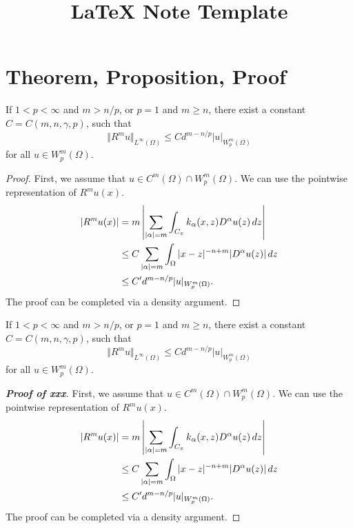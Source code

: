 \documentclass{article}
\title{\LaTeX{} Note Template}
\author{}
\date{}
\begin{document}
\maketitle

\section{Theorem, Proposition, Proof}

\begin{theorem}
    If $1<p<\infty$ and $m > n/p$, or $p=1$ and $m \ge n$, there exist a constant $C = C(m,n,\gamma,p)$, such that
    \begin{equation*}
        \Vert R^m u \Vert_{L^\infty(\Omega)} \le C d^{m-n/p} |u|_{W^m_p(\Omega)}
    \end{equation*}
    for all $u \in W^m_p(\Omega)$.
\end{theorem}
\begin{proof}
    First, we assume that $u \in C^m(\Omega) \cap W^m_p(\Omega)$. We can use the pointwise representation of $R^mu(x)$.
    \begin{align*}
        |R^mu(x)| ={} & m \left| \sum_{|\alpha| = m} \int_{C_x} k_{\alpha}(x,z) D^\alpha u(z)\,dz \right| \notag \\
        \le{}         & C \sum_{|\alpha|=m} \int_{\Omega} |x-z|^{-n+m} |D^\alpha u(z)|\,dz \notag                \\
        \le{}         & C' d^{m-n/p} |u|_{W^m_p(\Omega)}.
    \end{align*}
    The proof can be completed via a density argument.
\end{proof}

\begin{theorem}[xxx]
    If $1<p<\infty$ and $m > n/p$, or $p=1$ and $m \ge n$, there exist a constant $C = C(m,n,\gamma,p)$, such that
    \begin{equation*}
        \Vert R^m u \Vert_{L^\infty(\Omega)} \le C d^{m-n/p} |u|_{W^m_p(\Omega)}
    \end{equation*}
    for all $u \in W^m_p(\Omega)$.
\end{theorem}
\begin{proof}[\upshape\bfseries Proof of xxx]
    First, we assume that $u \in C^m(\Omega) \cap W^m_p(\Omega)$. We can use the pointwise representation of $R^mu(x)$.
    \begin{align*}
        |R^mu(x)| ={} & m \left| \sum_{|\alpha| = m} \int_{C_x} k_{\alpha}(x,z) D^\alpha u(z)\,dz \right| \notag \\
        \le{}         & C \sum_{|\alpha|=m} \int_{\Omega} |x-z|^{-n+m} |D^\alpha u(z)|\,dz \notag                \\
        \le{}         & C' d^{m-n/p} |u|_{W^m_p(\Omega)}.
    \end{align*}
    The proof can be completed via a density argument.
\end{proof}
\end{document}
